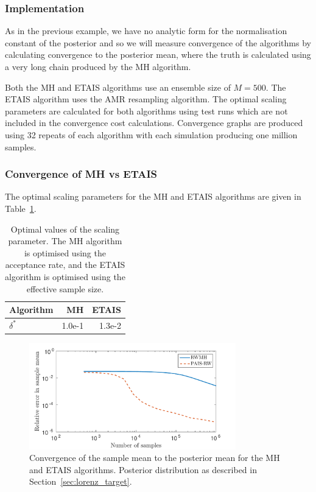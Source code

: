 \documentclass[final]{siamltex}
\begin{document}
\subsubsection{Implementation}\label{sec:lorenz_implementation}

As in the previous example, we have no analytic form for the normalisation constant of the posterior and so we will measure convergence of the algorithms by calculating convergence to the posterior mean, where the truth is calculated using a very long chain produced by the MH algorithm.

Both the MH and ETAIS algorithms use an ensemble size of $M=500$. The ETAIS algorithm uses the AMR resampling algorithm. The optimal scaling parameters are calculated for both algorithms using test runs which are not included in the convergence cost calculations. Convergence graphs are produced using 32 repeats of each algorithm with each simulation producing one million samples.

\subsubsection{Convergence of MH vs ETAIS}\label{sec:lorenz_conv}

The optimal scaling parameters for the MH and ETAIS algorithms are given in Table~\ref{table:Lorenz_opt_parameters}.

\begin{table}[!htb]
      \centering
        \begin{tabular}{|l|r|r|}
	\hline
	Algorithm	& MH & ETAIS \\ \hline
	$\delta^*$	& 1.0e-1     & 1.3e-2 \\
	\hline
	\end{tabular}
	\vspace{1mm}
	\caption{Optimal values of the scaling parameter. The MH algorithm is optimised using the acceptance rate, and the ETAIS algorithm is optimised using the effective sample size.}
	\label{table:Lorenz_opt_parameters}
\end{table}

\begin{figure}[htb]
\centering
\includegraphics[width=0.8\textwidth]{"figures/Lorenz_convergence"}
\caption{Convergence of the sample mean to the posterior mean for the MH and ETAIS algorithms. Posterior distribution as described in Section~\ref{sec:lorenz_target}.}
\label{fig:Lorenz_convergence}
\end{figure}
\end{document}
